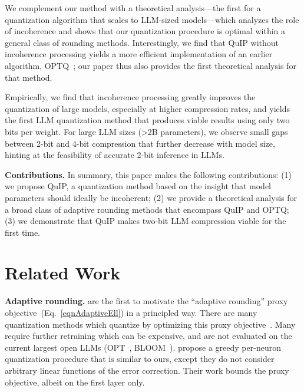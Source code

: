 We complement our method with a theoretical analysis---the first for a quantization algorithm that scales to LLM-sized models---which analyzes the role of incoherence and shows that our quantization procedure is optimal within a general class of rounding methods. Interestingly, we find that QuIP without incoherence processing yields a more efficient implementation of an earlier algorithm, OPTQ~\cite{frantar2023gptq}; our paper thus also provides the first theoretical analysis for that method.

Empirically, we find that incoherence processing greatly improves the quantization of large models, especially at higher compression rates, and yields the first LLM quantization method that produces viable results using only two bits per weight. For large LLM sizes (>2B parameters), we observe small gaps between 2-bit and 4-bit compression that further decrease with model size, hinting at the feasibility of accurate 2-bit inference in LLMs.

\textbf{Contributions.}\;
In summary, this paper makes the following contributions: (1) we propose QuIP, a quantization method based on the insight that model parameters should ideally be incoherent; (2) we provide a theoretical analysis for a broad class of adaptive rounding methods that encompass QuIP and OPTQ; (3) we demonstrate that QuIP makes two-bit LLM compression viable for the first time.

\section{Related Work}

\textbf{Adaptive rounding.}
\citet{nagel2020up} are the first to motivate the ``adaptive rounding'' proxy objective~(Eq.~\eqref{eqnAdaptiveEll}) in a principled way. There are many quantization methods which quantize by optimizing this proxy objective~\citep{dong2019hawq1,dong2020hawq2,hubara2021adaq,li2021brecq,liu2021ptqvit,nagel2020up,yao2021hawq3}. Many require further retraining which can be expensive, and are not evaluated on the current largest open LLMs (OPT~\citep{meta2022opt}, BLOOM~\citep{workshop2023bloom}).
\citet{lybrand2021greedy} propose a greedy per-neuron quantization procedure that is similar to ours, except they do not consider arbitrary linear functions of the error correction. Their work bounds the proxy objective, albeit on the first layer only.

